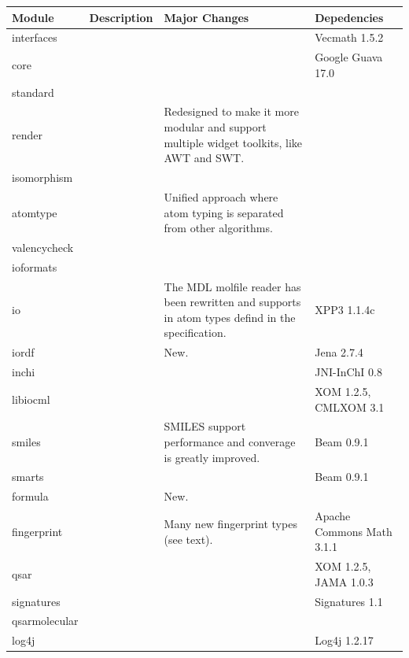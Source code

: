 \documentclass[10pt]{bmcart}
\begin{document}
\begin{backmatter}
    \begin{minipage}{1\textwidth}
    \renewcommand*{\thempfootnote}{\fnsymbol{mpfootnote}}
    \centering
    \begin{tabular}{lp{3cm}p{3cm}l}
  \textbf{Module}            & \textbf{Description}  & \textbf{Major Changes} & \textbf{Depedencies} \\ \hline
  interfaces                 &              & & Vecmath 1.5.2 \\ \hline
  core                       &              & & Google Guava 17.0 \\ \hline %
  standard                   &              & & \\ \hline
  render                     &              & Redesigned to make it more modular and support multiple widget toolkits, like AWT and SWT. & \\ \hline
  isomorphism                &              & & \\ \hline
  atomtype                   &              & Unified approach where atom typing is separated from other algorithms. & \\ \hline
  valencycheck               &              & & \\ \hline
  ioformats                  &              & & \\ \hline
  io                         &              & The MDL molfile reader has been rewritten and supports in atom types defind in the specification. & XPP3 1.1.4c \\ \hline
  iordf                      &              & New. & Jena 2.7.4 \\ \hline
  inchi                      &              & & JNI-InChI 0.8~\cite{Spjuth2013}  \\ \hline
  libiocml                   &              & & XOM 1.2.5, CMLXOM 3.1~\cite{Murray-Rust2011} \\ \hline
  smiles                     &              & SMILES support performance and converage is greatly improved. & Beam 0.9.1 \\ \hline %
  smarts                     &              & & Beam 0.9.1 \\ \hline %
  formula                    &              & New. & \\ \hline
  fingerprint                &              & Many new fingerprint types (see text). & Apache Commons Math 3.1.1 \\ \hline
  qsar                       &              & & XOM 1.2.5, JAMA 1.0.3~\cite{Hicklin2012} \\ \hline %
  signatures                 &              & & Signatures 1.1 \\ \hline %
  qsarmolecular              &              & & \\ \hline
  log4j                      &              & & Log4j 1.2.17 \\ \hline
    \end{tabular}
    \end{minipage}



\end{backmatter}
\end{document}
